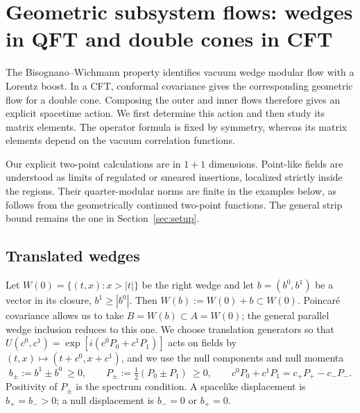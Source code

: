 \documentclass[a4paper,11pt]{article}
\theoremstyle{definition}
\begin{document}
\section{Geometric subsystem flows: wedges in QFT and double cones in CFT}
\label{sec:geometric-subregion-flows}

The Bisognano--Wichmann property identifies vacuum wedge modular flow with a Lorentz boost. In a CFT, conformal covariance gives the corresponding geometric flow for a double cone. Composing the outer and inner flows therefore gives an explicit spacetime action. We first determine this action and then study its matrix elements. The operator formula is fixed by symmetry, whereas its matrix elements depend on the vacuum correlation functions.

Our explicit two-point calculations are in $1+1$ dimensions. Point-like fields are understood as limits of regulated or smeared insertions, localized strictly inside the regions. Their quarter-modular norms are finite in the examples below, as follows from the geometrically continued two-point functions. The general strip bound remains the one in Section~\ref{sec:setup}.

\subsection{Translated wedges}\label{subsec:wedge-inclusion}

Let $W(0)=\{(t,x):x>|t|\}$ be the right wedge and let $b=(b^0,b^1)$ be a vector in its closure, $b^1\ge|b^0|$. Then $W(b):=W(0)+b\subset W(0)$. Poincar\'e covariance allows us to take $B=W(b)\subset A=W(0)$; the general parallel wedge inclusion reduces to this one. We choose translation generators so that $U(c^0,c^1)=\exp[i(c^0P_0+c^1P_1)]$ acts on fields by $(t,x)\mapsto(t+c^0,x+c^1)$, and we use the null components and null momenta
\begin{equation}
 b_\pm:=b^1\pm b^0\ \ge0,\qquad
 P_\pm:=\tfrac12(P_0\pm P_1)\ \ge0,\qquad
 c^0P_0+c^1P_1=c_+P_+-c_-P_- .
 \label{eq:null-components}
\end{equation}
Positivity of $P_\pm$ is the spectrum condition. A spacelike displacement is $b_+=b_->0$; a null displacement is $b_-=0$ or $b_+=0$.
\end{document}
